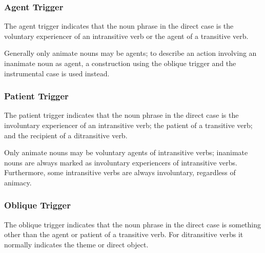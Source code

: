 \documentclass[grammar]{subfiles}
\begin{document}

\subsubsection{Agent Trigger}
\label{sssec:vm_agt_trigger}

The agent trigger indicates that the noun phrase in the direct case is the
voluntary experiencer of an intransitive verb or the agent of a transitive
verb.

Generally only animate nouns may be agents; to describe an action involving an
inanimate noun as agent, a construction using the oblique trigger and the
instrumental case is used instead. 

\subsubsection{Patient Trigger}
\label{sssec:vm_pat_trigger}

The patient trigger indicates that the noun phrase in the direct case is the
involuntary experiencer of an intransitive verb; the patient of a transitive
verb; and the recipient of a ditransitive verb.  

Only animate nouns may be voluntary agents of intransitive verbs; inanimate
nouns are always marked as involuntary experiencers of intransitive verbs.
Furthermore, some intransitive verbs are always involuntary, regardless of
animacy. 

\subsubsection{Oblique Trigger}
\label{sssec:vm_obl_trigger}

The oblique trigger indicates that the noun phrase in the direct case is
something other than the agent or patient of a transitive verb.  For
ditransitive verbs it normally indicates the theme or direct object.
\end{document}
